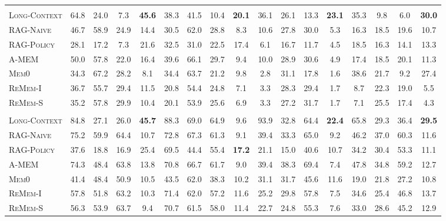 \begin{table}[t]
{\begin{tabular}{lccc>{\columncolor{cuscol}}c|ccc>{\columncolor{cuscol}}c|ccc>{\columncolor{cuscol}}c|ccc>{\columncolor{cuscol}}c}
\rowcolor{llmheader}
\multicolumn{17}{c}{\textbf{\texttt{GPT-4o-mini}}} \\
\textsc{Long-Context} & 64.8 & 24.0 & 7.3 & \textbf{45.6} & 38.3 & 41.5 & 10.4 & \textbf{20.1} & 36.1 & 26.1 & 13.3 & \textbf{23.1} & 35.3 & 9.8 & 6.0 & \textbf{30.0} \\
\textsc{RAG-Naive}\citep{lewis2020retrieval}    & 46.7 & 58.9 & 24.9 & 14.4 & 30.5 & 62.0 & 28.8 & 8.3 & 10.6 & 27.8 & 30.0 & 5.3 & 16.3 & 18.5 & 19.6 & 10.7 \\
\textsc{RAG-Policy}   & 28.1 & 17.2 & 7.3 & 21.6 & 32.5 & 31.0 & 22.5 & 17.4 & 6.1 & 16.7 & 11.7 & 4.5 & 18.5 & 16.3 & 14.1 & 13.3 \\
\textsc{A-MEM}~\citep{xu2026mem}        & 50.0 & 57.8 & 22.0 & 16.4 & 39.6 & 66.1 & 29.7 & 9.4 & 10.0 & 28.9 & 30.6 & 4.9 & 17.4 & 18.5 & 20.1 & 11.3 \\
\textsc{Mem0}~\citep{chhikara2025mem0}         & 34.3 & 67.2 & 28.2 & 8.1 & 34.4 & 63.7 & 21.2 & 9.8 & 2.8 & 31.1 & 17.8 & 1.6 & 38.6 & 21.7 & 9.2 & 27.4 \\
\textsc{ReMem-I}~\citep{shu2026remem}      & 36.7 & 55.7 & 29.4 & 11.5 & 20.8 & 54.4 & 24.8 & 7.1 & 3.3 & 28.3 & 29.4 & 1.7 & 8.7 & 22.3 & 19.0 & 5.5 \\
\textsc{ReMem-S}~\citep{shu2026remem}      & 35.2 & 57.8 & 29.9 & 10.4 & 20.1 & 53.9 & 25.6 & 6.9 & 3.3 & 27.2 & 31.7 & 1.7 & 7.1 & 25.5 & 17.4 & 4.3 \\
\midrule

\rowcolor{llmheader}
\multicolumn{17}{c}{\textbf{\texttt{Gemini-2.5-Flash-Lite}}} \\
\textsc{Long-Context} & 84.8 & 27.1 & 26.0 & \textbf{45.7} & 88.3 & 69.0 & 64.9 & 9.6 & 93.9 & 32.8 & 64.4 & \textbf{22.4} & 65.8 & 29.3 & 36.4 & \textbf{29.5} \\
\textsc{RAG-Naive}\citep{lewis2020retrieval}    & 75.2 & 59.9 & 64.4 & 10.7 & 72.8 & 67.3 & 61.3 & 9.1 & 39.4 & 33.3 & 65.0 & 9.2 & 46.2 & 37.0 & 60.3 & 11.6 \\
\textsc{RAG-Policy}   & 37.6 & 18.8 & 16.9 & 25.4 & 69.5 & 44.4 & 55.4 & \textbf{17.2} & 21.1 & 15.0 & 40.6 & 10.7 & 34.2 & 30.4 & 53.3 & 11.1 \\
\textsc{A-MEM}~\citep{xu2026mem}        & 74.3 & 48.4 & 63.8 & 13.8 & 70.8 & 66.7 & 61.7 & 9.0 & 39.4 & 38.3 & 69.4 & 7.4 & 47.8 & 34.8 & 59.2 & 12.7 \\
\textsc{Mem0}~\citep{chhikara2025mem0}         & 41.4 & 48.4 & 50.9 & 10.5 & 43.5 & 62.0 & 38.3 & 10.2 & 31.1 & 31.7 & 45.6 & 11.6 & 19.0 & 21.8 & 27.2 & 10.8 \\
\textsc{ReMem-I}~\citep{shu2026remem}      & 57.8 & 51.8 & 63.2 & 10.3 & 71.4 & 62.0 & 57.2 & 11.6 & 25.2 & 29.8 & 57.8 & 7.5 & 34.6 & 25.4 & 46.8 & 13.7 \\
\textsc{ReMem-S}~\citep{shu2026remem}      & 56.3 & 53.9 & 63.7 & 9.4 & 70.7 & 61.5 & 58.0 & 11.4 & 22.7 & 24.8 & 55.3 & 7.6 & 33.0 & 28.6 & 45.2 & 12.9 \\
\bottomrule
\end{tabular}%
}
\endgroup
\end{table}

